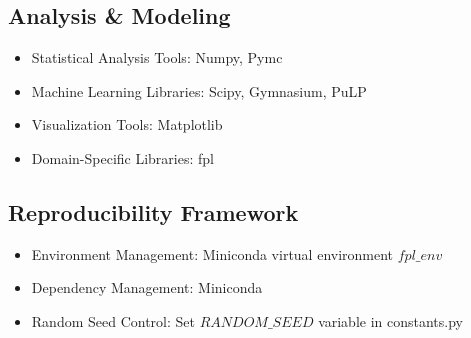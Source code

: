 \subsection{Analysis \& Modeling}
\begin{itemize}
    \item Statistical Analysis Tools: Numpy, Pymc
    \item Machine Learning Libraries: Scipy, Gymnasium, PuLP
    \item Visualization Tools: Matplotlib
    \item Domain-Specific Libraries: fpl \cite{macLeod2019}
\end{itemize}

\subsection{Reproducibility Framework}
\begin{itemize}
    \item Environment Management: Miniconda virtual environment $fpl\_env$
    \item Dependency Management: Miniconda 
    \item Random Seed Control: Set $RANDOM\_ SEED$ variable in constants.py
\end{itemize}


